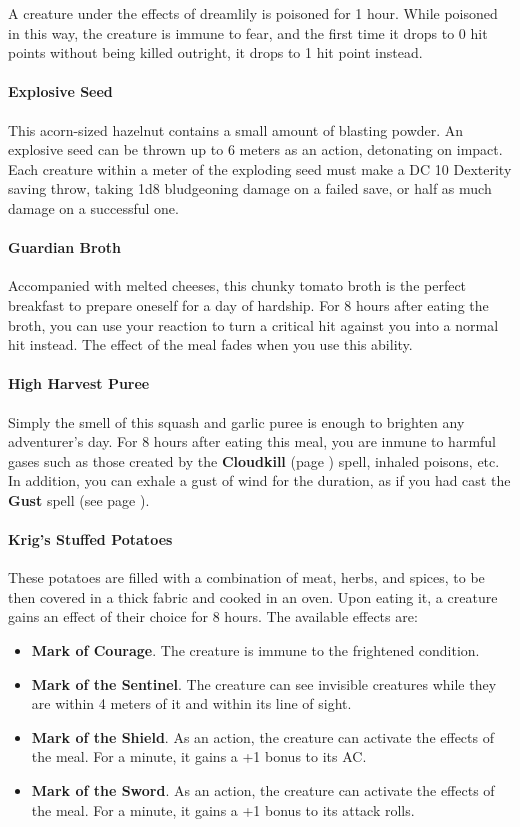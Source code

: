         A creature under the effects of dreamlily is poisoned for 1 hour.
        While poisoned in this way, the creature is immune to fear, and the first time it drops to 0 hit points without being killed outright, it drops to 1 hit point instead.
    \paragraph{Explosive Seed}
        This acorn-sized hazelnut contains a small amount of blasting powder.
        An explosive seed can be thrown up to 6 meters as an action, detonating on impact.
        Each creature within a meter of the exploding seed must make a DC 10 Dexterity saving throw, taking 1d8 bludgeoning damage on a failed save, or half as much damage on a successful one.
    \paragraph{Guardian Broth}
        Accompanied with melted cheeses, this chunky tomato broth is the perfect breakfast to prepare oneself for a day of hardship.
        For 8 hours after eating the broth, you can use your reaction to turn a critical hit against you into a normal hit instead.
		The effect of the meal fades when you use this ability.
    \paragraph{High Harvest Puree}
        Simply the smell of this squash and garlic puree is enough to brighten any adventurer's day.
        For 8 hours after eating this meal, you are inmune to harmful gases such as those created by the \textbf{Cloudkill} (page \pageref{spell::cloudkill}) spell, inhaled poisons, etc.
        In addition, you can exhale a gust of wind for the duration, as if you had cast the \textbf{Gust} spell (see page \pageref{spell::gust}).
    \paragraph{Krig's Stuffed Potatoes}
        These potatoes are filled with a combination of meat, herbs, and spices, to be then covered in a thick fabric and cooked in an oven.
        Upon eating it, a creature gains an effect of their choice for 8 hours.
        The available effects are:
        \begin{itemize}
            \item \textbf{Mark of Courage}.
                The creature is immune to the frightened condition.
            \item \textbf{Mark of the Sentinel}.
                The creature can see invisible creatures while they are within 4 meters of it and within its line of sight.
            \item \textbf{Mark of the Shield}.
                As an action, the creature can activate the effects of the meal.
                For a minute, it gains a +1 bonus to its AC.
            \item \textbf{Mark of the Sword}.
                As an action, the creature can activate the effects of the meal.
                For a minute, it gains a +1 bonus to its attack rolls.
        \end{itemize}
